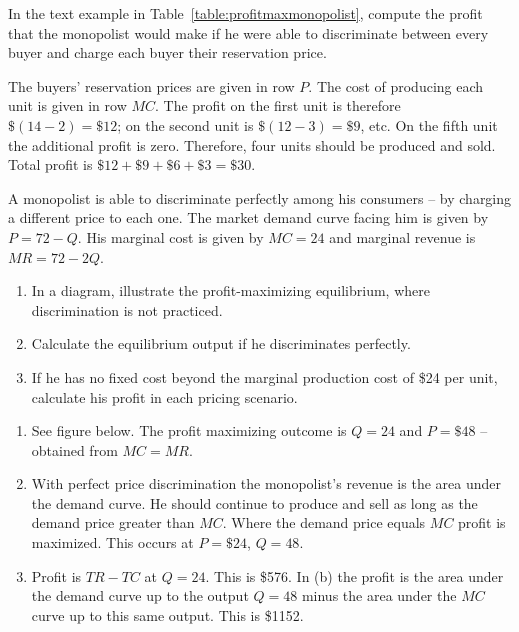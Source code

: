 \begin{enumialphparenastyle}
\begin{ex}\label{ex:ch10ex6}
In the text example in Table~\ref{table:profitmaxmonopolist}, compute the profit that the monopolist would make if he were able to discriminate between every buyer and charge each buyer their reservation price.
\begin{sol}
	The buyers' reservation prices are given in row $P$. The cost of producing each unit is given in row $MC$. The profit on the first unit is therefore $\$(14-2)=\$12$; on the second unit is $\$(12-3)=\$9$, etc. On the fifth unit the additional profit is zero. Therefore, four units should be produced and sold. Total profit is $\$12+\$9+\$6+\$3=\$30$.
	
\end{sol}
\end{ex}

\begin{ex}\label{ex:ch10ex7}
A monopolist is able to discriminate perfectly among his consumers -- by charging a different price to each one. The market demand curve facing him is given by $P=72-Q$. His marginal cost is given by $MC=24$ and marginal revenue is $MR=72-2Q$.
\begin{enumerate}
	\item	In a diagram, illustrate the profit-maximizing equilibrium, where discrimination is not practiced.
	\item	Calculate the equilibrium output if he discriminates perfectly.
	\item	If he has no fixed cost beyond the marginal production cost of \$24 per unit, calculate his profit in each pricing scenario.
\end{enumerate}
\begin{sol}
\begin{enumerate}
	\item	See figure below. The profit maximizing outcome is $Q=24$ and $P=\$48$ -- obtained from $MC=MR$.
	\item	With perfect price discrimination the monopolist's revenue is the area under the demand curve. He should continue to produce and sell as long as the demand price greater than $MC$. Where the demand price equals $MC$ profit is maximized. This occurs at $P=\$24$, $Q=48$.
	\item	Profit is $TR-TC$ at $Q=24$. This is \$576. In (b) the profit is the area under the demand curve up to the output $Q=48$ minus the area under the $MC$ curve up to this same output. This is \$1152.
\end{enumerate}
\begin{center}

\end{center}
\end{sol}
\end{ex}
\end{enumialphparenastyle}
